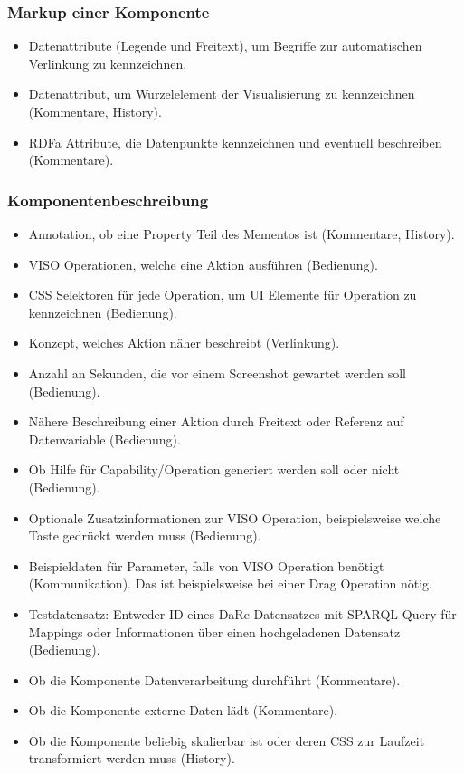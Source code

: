 \documentclass[
	headsepline,
	footsepline,
	fontsize=12pt,
	bibliography=totoc
]{scrbook}
\begin{document}
\subsubsection{Markup einer Komponente}

\begin{itemize}
	\item Datenattribute (Legende und Freitext), um Begriffe zur automatischen Verlinkung zu kennzeichnen.
	\item Datenattribut, um Wurzelelement der Visualisierung zu kennzeichnen (Kommentare, History).
	\item RDFa Attribute, die Datenpunkte kennzeichnen und eventuell beschreiben (Kommentare).
\end{itemize}

\subsubsection{Komponentenbeschreibung}

\begin{itemize}
	\item Annotation, ob eine Property Teil des Mementos ist (Kommentare, History).
	\item VISO Operationen, welche eine Aktion ausführen (Bedienung).
	\item CSS Selektoren für jede Operation, um UI Elemente für Operation zu kennzeichnen (Bedienung).
	\item Konzept, welches Aktion näher beschreibt (Verlinkung).
	\item Anzahl an Sekunden, die vor einem Screenshot gewartet werden soll (Bedienung).
	\item Nähere Beschreibung einer Aktion durch Freitext oder Referenz auf Datenvariable (Bedienung).
	\item Ob Hilfe für Capability/Operation generiert werden soll oder nicht (Bedienung).
	\item Optionale Zusatzinformationen zur VISO Operation, beispielsweise welche Taste gedrückt werden muss (Bedienung).
	\item Beispieldaten für Parameter, falls von VISO Operation benötigt (Kommunikation). Das ist beispielsweise bei einer Drag Operation nötig.
	\item Testdatensatz: Entweder ID eines DaRe Datensatzes mit SPARQL Query für Mappings oder Informationen über einen hochgeladenen Datensatz (Bedienung).
	\item Ob die Komponente Datenverarbeitung durchführt (Kommentare).
	\item Ob die Komponente externe Daten lädt (Kommentare).
	\item Ob die Komponente beliebig skalierbar ist oder deren CSS zur Laufzeit transformiert werden muss (History).
\end{itemize}
\end{document}
